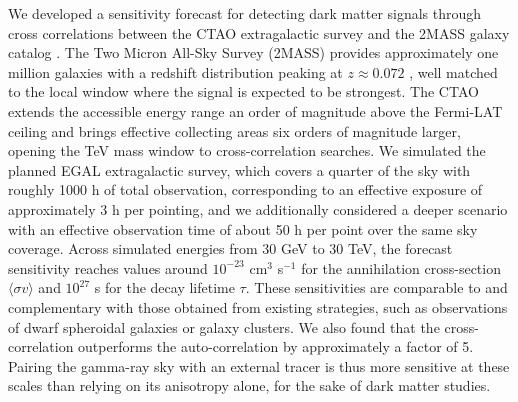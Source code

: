 We developed a sensitivity forecast for detecting dark matter signals through cross correlations between the CTAO extragalactic survey and the 2MASS galaxy catalog \cite{Pinetti:2025hgd}. 
The Two Micron All-Sky Survey (2MASS) provides approximately one million galaxies with a redshift distribution peaking at $z \approx 0.072$ \cite{2MASS:2006qir}, well matched to the local window where the signal is expected to be strongest. 
The CTAO \cite{CTAConsortium:2017dvg} extends the accessible energy range an order of magnitude above the Fermi-LAT ceiling and brings effective collecting areas six orders of magnitude larger, opening the TeV mass window to cross-correlation searches. We simulated the planned EGAL extragalactic survey, which covers a quarter of the sky with roughly 1000 h of total observation, corresponding to an effective exposure of approximately 3 h per pointing, and we additionally considered a deeper scenario with an effective observation time of about 50 h per point over the same sky coverage. Across simulated energies from 30 GeV to 30 TeV, the forecast sensitivity reaches values around $10^{-23}$ cm$^3$ s$^{-1}$ for the annihilation cross-section $\langle \sigma v \rangle$ and $10^{27}$ s for the decay lifetime $\tau$. These sensitivities are comparable to and complementary with those obtained from existing strategies, such as observations of dwarf spheroidal galaxies or galaxy clusters. We also found that the cross-correlation outperforms the auto-correlation by approximately a factor of 5. Pairing the gamma-ray sky with an external tracer is thus more sensitive at these scales than relying on its anisotropy alone, for the sake of dark matter studies.

